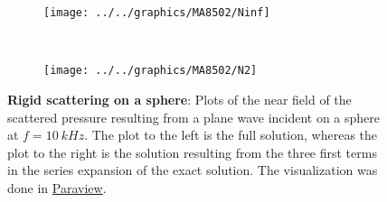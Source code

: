 \begin{figure}
	\centering
	\begin{subfigure}[t]{0.48\textwidth}
		\centering
		\texttt{[image: ../../graphics/MA8502/Ninf]}
		\label{Fig5:S1Ninf}
	\end{subfigure}
	~
	\begin{subfigure}[t]{0.48\textwidth}
		\centering
		\texttt{[image: ../../graphics/MA8502/N2]}
		\label{Fig5:S1N2}
	\end{subfigure}
	\caption{\textbf{Rigid scattering on a sphere}: Plots of the near field of the scattered pressure resulting from a plane wave incident on a sphere at $f=\SI{10}{kHz}$. The plot to the left is the full solution, whereas the plot to the right is the solution resulting from the three first terms in the series expansion of the exact solution. The visualization was done in \href{http://www.paraview.org/}{Paraview}.}
	\label{Fig5:Benchmarks_NearField}
\end{figure}

